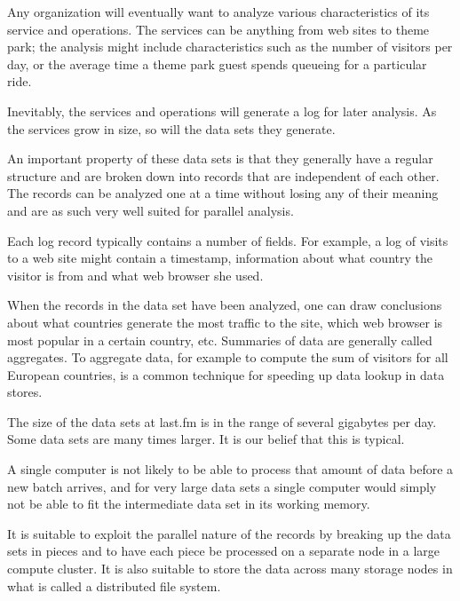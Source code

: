Any organization will eventually want to analyze various characteristics of
its service and operations. The services can be anything from web sites to
theme park; the analysis might include characteristics such as the number of
visitors per day, or the average time a theme park guest spends queueing for a
particular ride.

Inevitably, the services and operations will generate a log for later
analysis. As the services grow in size, so will the data sets they generate.

An important property of these data sets is that they generally have a regular
structure and are broken down into records that are independent of each other.
The records can be analyzed one at a time without losing any of their meaning
and are as such very well suited for parallel analysis.

Each log record typically contains a number of fields. For example, a log of
visits to a web site might contain a timestamp, information about what country
the visitor is from and what web browser she used.

When the records in the data set have been analyzed, one can draw conclusions
about what countries generate the most traffic to the site, which web browser
is most popular in a certain country, etc. Summaries of data are generally
called aggregates. To aggregate data, for example to compute the sum of
visitors for all European countries, is a common technique for speeding up
data lookup in data stores.

The size of the data sets at last.fm is in the range of several gigabytes per
day. Some data sets are many times larger. It is our belief that this is
typical.

A single computer is not likely to be able to process that amount of data
before a new batch arrives, and for very large data sets a single computer
would simply not be able to fit the intermediate data set in its working
memory.

It is suitable to exploit the parallel nature of the records by breaking up
the data sets in pieces and to have each piece be processed on a separate
node in a large compute cluster. It is also suitable to store the data across
many storage nodes in what is called a distributed file system.





